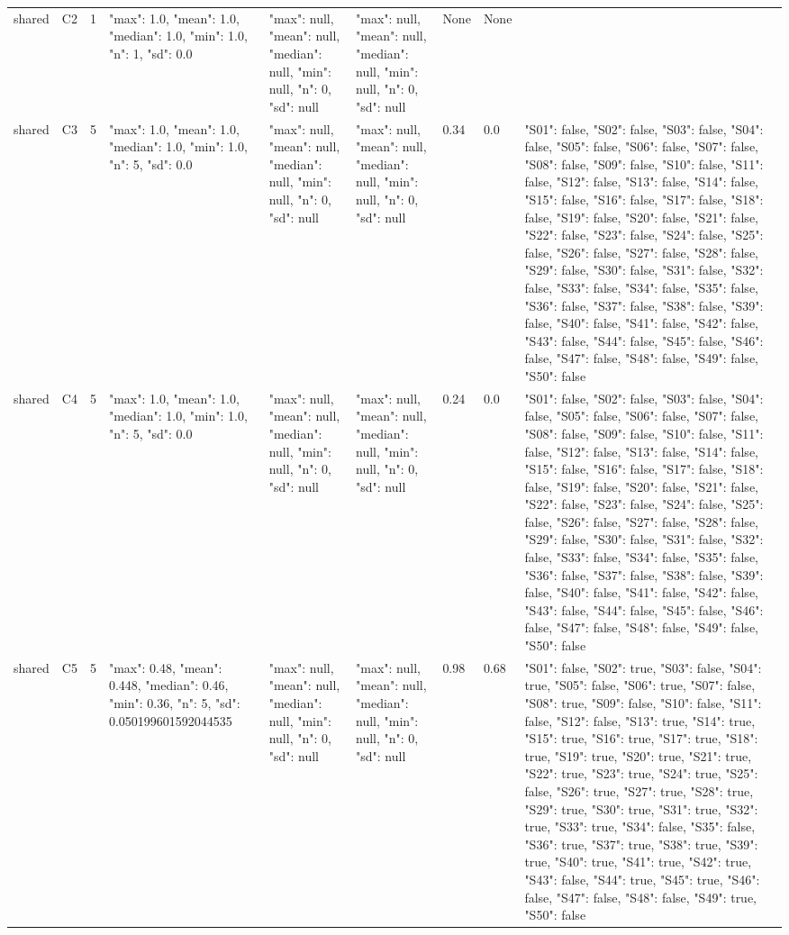 \begin{tabular}{lllllllll}
shared & C2 & 1 & {"max": 1.0, "mean": 1.0, "median": 1.0, "min": 1.0, "n": 1, "sd": 0.0} & {"max": null, "mean": null, "median": null, "min": null, "n": 0, "sd": null} & {"max": null, "mean": null, "median": null, "min": null, "n": 0, "sd": null} & None & None & {} \\
shared & C3 & 5 & {"max": 1.0, "mean": 1.0, "median": 1.0, "min": 1.0, "n": 5, "sd": 0.0} & {"max": null, "mean": null, "median": null, "min": null, "n": 0, "sd": null} & {"max": null, "mean": null, "median": null, "min": null, "n": 0, "sd": null} & 0.34 & 0.0 & {"S01": false, "S02": false, "S03": false, "S04": false, "S05": false, "S06": false, "S07": false, "S08": false, "S09": false, "S10": false, "S11": false, "S12": false, "S13": false, "S14": false, "S15": false, "S16": false, "S17": false, "S18": false, "S19": false, "S20": false, "S21": false, "S22": false, "S23": false, "S24": false, "S25": false, "S26": false, "S27": false, "S28": false, "S29": false, "S30": false, "S31": false, "S32": false, "S33": false, "S34": false, "S35": false, "S36": false, "S37": false, "S38": false, "S39": false, "S40": false, "S41": false, "S42": false, "S43": false, "S44": false, "S45": false, "S46": false, "S47": false, "S48": false, "S49": false, "S50": false} \\
shared & C4 & 5 & {"max": 1.0, "mean": 1.0, "median": 1.0, "min": 1.0, "n": 5, "sd": 0.0} & {"max": null, "mean": null, "median": null, "min": null, "n": 0, "sd": null} & {"max": null, "mean": null, "median": null, "min": null, "n": 0, "sd": null} & 0.24 & 0.0 & {"S01": false, "S02": false, "S03": false, "S04": false, "S05": false, "S06": false, "S07": false, "S08": false, "S09": false, "S10": false, "S11": false, "S12": false, "S13": false, "S14": false, "S15": false, "S16": false, "S17": false, "S18": false, "S19": false, "S20": false, "S21": false, "S22": false, "S23": false, "S24": false, "S25": false, "S26": false, "S27": false, "S28": false, "S29": false, "S30": false, "S31": false, "S32": false, "S33": false, "S34": false, "S35": false, "S36": false, "S37": false, "S38": false, "S39": false, "S40": false, "S41": false, "S42": false, "S43": false, "S44": false, "S45": false, "S46": false, "S47": false, "S48": false, "S49": false, "S50": false} \\
shared & C5 & 5 & {"max": 0.48, "mean": 0.448, "median": 0.46, "min": 0.36, "n": 5, "sd": 0.050199601592044535} & {"max": null, "mean": null, "median": null, "min": null, "n": 0, "sd": null} & {"max": null, "mean": null, "median": null, "min": null, "n": 0, "sd": null} & 0.98 & 0.68 & {"S01": false, "S02": true, "S03": false, "S04": true, "S05": false, "S06": true, "S07": false, "S08": true, "S09": false, "S10": false, "S11": false, "S12": false, "S13": true, "S14": true, "S15": true, "S16": true, "S17": true, "S18": true, "S19": true, "S20": true, "S21": true, "S22": true, "S23": true, "S24": true, "S25": false, "S26": true, "S27": true, "S28": true, "S29": true, "S30": true, "S31": true, "S32": true, "S33": true, "S34": false, "S35": false, "S36": true, "S37": true, "S38": true, "S39": true, "S40": true, "S41": true, "S42": true, "S43": false, "S44": true, "S45": true, "S46": false, "S47": false, "S48": false, "S49": true, "S50": false} \\

\end{tabular}

